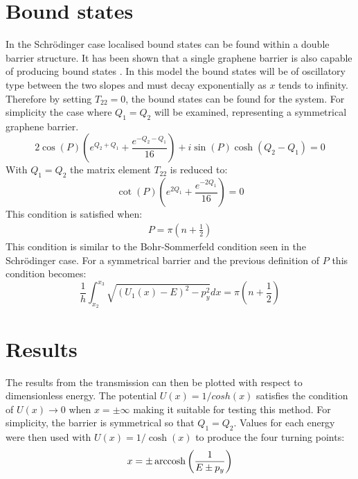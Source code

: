 	\section{Bound states}
	\label{WKB Potential Barrier - Bound states}
		In the Schr{\" o}dinger case localised bound states can be found within a double barrier structure. It has been shown that a single graphene barrier is also capable of producing bound states \cite{b3}. In this model the bound states will be of oscillatory type between the two slopes and must decay exponentially as $x$ tends to infinity. Therefore by setting $T_{22}=0$, the bound states can be found for the system. For simplicity the case where $Q_{1}=Q_{2}$ will be examined, representing a symmetrical graphene barrier. 
		\begin{equation}
			2\cos(P)\left(e^{Q_{2}+Q_{1}}+\frac{e^{-Q_{2}-Q_{1}}}{16}\right)+i\sin(P)\cosh(Q_{2}-Q_{1})=0
		\end{equation}
		 With $Q_{1}=Q_{2}$ the matrix element $T_{22}$ is reduced to:
		\begin{equation}
			\cot(P)\left(e^{2Q_{1}}+\frac{e^{-2Q_{1}}}{16}\right)=0
		\end{equation}
		This condition is satisfied when:
		\begin{align}
			P=\pi\left(n+\frac{1}{2}\right)
		\end{align}
		This condition is similar to the Bohr-Sommerfeld condition seen in the Schr{\" o}dinger case. For a symmetrical barrier and the previous definition of $P$ this condition becomes:
		\begin{equation}
			\frac{1}{h}\int_{x_{2}}^{x_{3}}\sqrt{\left(U_{1}\left(x\right)-E\right)^2-p_{y}^{2}}dx=\pi\left(n+\frac{1}{2}\right)
			\label{wkb-bound-eq}
		\end{equation}
	\section{Results}
	\label{WKB Potential Barrier - Results}
		The results from the transmission can then be plotted with respect to dimensionless energy. The potential $U\left(x\right)=1/cosh\left(x\right)$ satisfies the condition of $U\left(x\right) \rightarrow 0$ when $x=\pm\infty$ making it suitable for testing this method. For simplicity, the barrier is symmetrical so that $Q_{1}=Q_{2}$. Values for each energy were then used with $U\left(x\right)=1/\cosh(x)$ to produce the four turning points:
		\begin{align}
			x=\pm \operatorname{arccosh}\left(\frac{1}{E \pm p_{y}}\right)
		\end{align}

